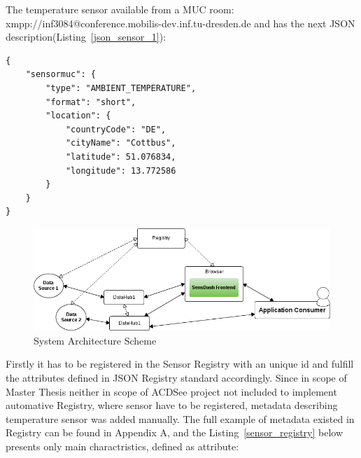 The temperature sensor available from a MUC room: xmpp://inf3084@conference.mobilis-dev.inf.tu-dresden.de and has the next JSON description(Listing~\ref{json_sensor_1}):
	\begin{lstlisting}[label=json_sensor_1,caption=JSON Description Format]
{
    "sensormuc": {
        "type": "AMBIENT_TEMPERATURE",
        "format": "short",
        "location": {
            "countryCode": "DE",
            "cityName": "Cottbus",
            "latitude": 51.076834,
            "longitude": 13.772586
        }
    }
}
	\end{lstlisting}
     \begin{figure}[H]
        \centering
        \includegraphics[scale=0.6]{images/UseCaseScheme1.png}   
        \caption[Use Case System Architecture Scheme]{System Architecture Scheme}                         
        \end{figure}
Firstly it has to be registered in the Sensor Registry with an unique id and fulfill the attributes defined in JSON Registry standard accordingly. Since in scope of Master Thesis neither in scope of ACDSee project not included to implement automative Registry, where sensor have to be registered, metadata describing temperature sensor was added manually. The full example of metadata existed in Registry can be found in Appendix A, and the Listing~\ref{sensor_registry} below presents only main charactristics, defined as attribute:
